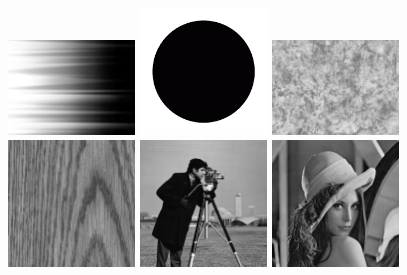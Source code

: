 \documentclass[a4paper]{article}
\begin{document}
\begin{figure}[h]
\centering
\includegraphics[width=0.3\textwidth]{images/fuzzy.jpeg}
\includegraphics[width=0.3\textwidth]{images/circ2.png}
\includegraphics[width=0.3\textwidth]{images/cloud.jpeg}
\includegraphics[width=0.3\textwidth]{images/wood.jpg}
\includegraphics[width=0.3\textwidth]{images/cameraman.png}
\includegraphics[width=0.3\textwidth]{images/lena.jpg}

\end{figure}
\end{document}
